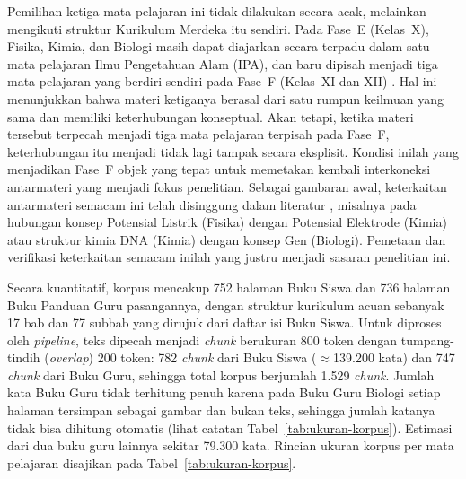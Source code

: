 \documentclass[../../thesis]{subfiles}
\begin{document}
Pemilihan ketiga mata pelajaran ini tidak dilakukan secara acak,
melainkan mengikuti struktur Kurikulum Merdeka itu sendiri. Pada Fase~E
(Kelas~X), Fisika, Kimia, dan Biologi masih dapat diajarkan secara
terpadu dalam satu mata pelajaran Ilmu Pengetahuan Alam (IPA), dan baru
dipisah menjadi tiga mata pelajaran yang berdiri sendiri pada Fase~F
(Kelas~XI dan XII) \parencite{kemendikbudristek_kepmen262_2022}. Hal ini
menunjukkan bahwa materi ketiganya berasal dari satu rumpun keilmuan yang
sama dan memiliki keterhubungan konseptual. Akan tetapi, ketika materi tersebut
terpecah menjadi tiga mata pelajaran terpisah pada Fase~F, keterhubungan
itu menjadi tidak lagi tampak secara eksplisit. Kondisi inilah yang
menjadikan Fase~F objek yang tepat untuk memetakan kembali interkoneksi
antarmateri yang menjadi fokus penelitian. Sebagai gambaran awal,
keterkaitan antarmateri semacam ini telah disinggung dalam literatur
\parencite{semilarski_expanding_2022}, misalnya pada hubungan konsep
Potensial Listrik (Fisika) dengan Potensial Elektrode (Kimia) atau
struktur kimia DNA (Kimia) dengan konsep Gen (Biologi). Pemetaan dan
verifikasi keterkaitan semacam inilah yang justru menjadi sasaran
penelitian ini.

Secara kuantitatif, korpus mencakup 752 halaman Buku Siswa dan 736 halaman Buku
Panduan Guru pasangannya, dengan struktur kurikulum acuan sebanyak 17 bab dan 77
subbab yang dirujuk dari daftar isi Buku Siswa. Untuk diproses oleh
\textit{pipeline}, teks dipecah menjadi \textit{chunk} berukuran 800 token
dengan tumpang-tindih (\textit{overlap}) 200 token: 782 \textit{chunk} dari Buku
Siswa ($\approx$139.200 kata) dan 747 \textit{chunk} dari Buku Guru, sehingga
total korpus berjumlah 1.529 \textit{chunk}. Jumlah kata Buku Guru tidak
terhitung penuh karena pada Buku Guru Biologi setiap halaman tersimpan sebagai
gambar dan bukan teks, sehingga jumlah katanya tidak bisa dihitung otomatis
(lihat catatan Tabel~\ref{tab:ukuran-korpus}). Estimasi dari dua buku guru
lainnya sekitar 79.300 kata.
Rincian ukuran korpus per mata pelajaran disajikan pada
Tabel~\ref{tab:ukuran-korpus}.
\end{document}
